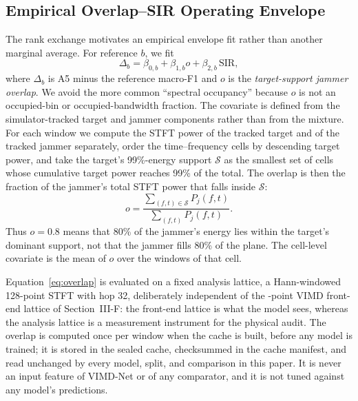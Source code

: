 \documentclass[letterpaper,journal]{IEEEtran}
\begin{document}
\subsection{Empirical Overlap--SIR Operating Envelope}
The rank exchange motivates an empirical envelope fit rather than another
marginal average. For reference $b$, we fit
\begin{equation}
\Delta_b=\beta_{0,b}+\beta_{1,b}o+\beta_{2,b}\,\mathrm{SIR},
\label{eq:envelope}
\end{equation}
where $\Delta_b$ is A5 minus the reference macro-F1 and $o$ is the
\emph{target-support jammer overlap}. We avoid the more common ``spectral
occupancy'' because $o$ is not an occupied-bin or occupied-bandwidth fraction.
The covariate is defined from the simulator-tracked target and jammer
components rather than from the mixture. For each window we compute the STFT
power of the tracked target and of the tracked jammer separately, order the
time--frequency cells by descending target power, and take the target's
99\%-energy support $\mathcal{S}$ as the smallest set of cells whose cumulative
target power reaches 99\% of the total. The overlap is then the fraction of the
jammer's total STFT power that falls inside $\mathcal{S}$:
\begin{equation}
o=\frac{\sum_{(f,t)\in\mathcal{S}}P_j(f,t)}{\sum_{(f,t)}P_j(f,t)}.
\label{eq:overlap}
\end{equation}
Thus $o=0.8$ means that 80\% of the jammer's energy lies within the target's
dominant support, not that the jammer fills 80\% of the plane. The cell-level
covariate is the mean of $o$ over the windows of that cell.

Equation~\eqref{eq:overlap} is evaluated on a fixed analysis lattice, a
Hann-windowed 128-point STFT with hop 32, deliberately independent of the
\NFft-point VIMD front-end lattice of Section~III-F: the front-end lattice is
what the model sees, whereas the analysis lattice is a measurement instrument
for the physical audit. The overlap is computed once per window when the cache
is built, before any model is trained; it is stored in the sealed cache,
checksummed in the cache manifest, and read unchanged by every model, split,
and comparison in this paper. It is never an
input feature of VIMD-Net or of any comparator, and it is not tuned against any
model's predictions.
\end{document}

